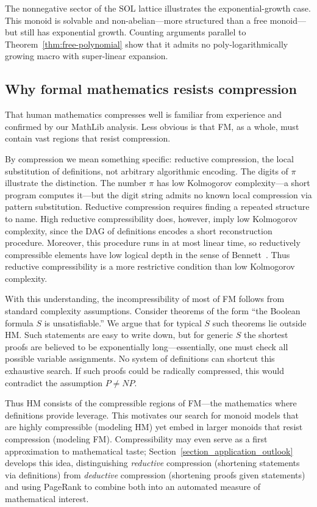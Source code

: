\documentclass[12pt]{amsart}
\theoremstyle{definition}
\theoremstyle{remark}
\begin{document}
The nonnegative sector of the SOL lattice illustrates the exponential-growth case.
This monoid is solvable and non-abelian---more structured than a free monoid---but still has exponential growth.
Counting arguments parallel to Theorem~\ref{thm:free-polynomial} show that it admits no poly-logarithmically growing macro with super-linear expansion.

\subsection{Why formal mathematics resists compression}

That human mathematics compresses well is familiar from experience and confirmed by our MathLib analysis.
Less obvious is that FM, as a whole, must contain vast regions that resist compression.

By compression we mean something specific: reductive compression, the local substitution of definitions, not arbitrary algorithmic encoding.
The digits of $\pi$ illustrate the distinction.
The number $\pi$ has low Kolmogorov complexity---a short program computes it---but the digit string admits no known local compression via pattern substitution.
Reductive compression requires finding a repeated structure to name.
High reductive compressibility does, however, imply low 
Kolmogorov complexity, since the DAG of definitions encodes a short reconstruction procedure.
Moreover, this procedure runs in at most linear time, so reductively compressible elements have low logical depth in the sense of Bennett~\cite{BennettDepth}.
Thus reductive compressibility is a more restrictive condition than low Kolmogorov complexity.

With this understanding, the incompressibility of most of FM follows from standard complexity assumptions.
Consider theorems of the form ``the Boolean formula $S$ is unsatisfiable.'' 
We argue that for typical $S$ such theorems lie outside HM.
Such statements are easy to write down, but for generic $S$ the shortest proofs are believed to be exponentially long---essentially, one must check all possible variable assignments.
No system of definitions can shortcut this exhaustive search.
If such proofs could be radically compressed, this would contradict the assumption $P \neq NP$.

Thus HM consists of the compressible regions of FM---the mathematics where definitions provide leverage.
This motivates our search for monoid models that are highly compressible (modeling HM) yet embed in larger monoids that resist compression (modeling FM).
Compressibility may even serve as a first approximation to mathematical taste; Section~\ref{section_application_outlook} develops 
this idea, distinguishing \emph{reductive} compression (shortening statements via definitions) from \emph{deductive} compression (shortening proofs given statements) and using PageRank to combine both into an automated measure of mathematical interest.
 
\end{document}
